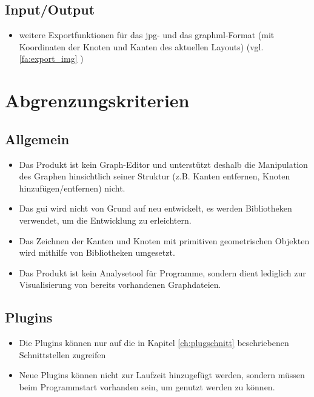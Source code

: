 \subsection{Input/Output}
  \begin{itemize}
    \item weitere Exportfunktionen für das \gls{jpg}- und das \gls{graphml}-Format (mit Koordinaten der Knoten und Kanten des aktuellen Layouts) (vgl. \ref{fa:export_img} )
  \end{itemize}
  
\section{Abgrenzungskriterien}

\subsection{Allgemein}
  \begin{itemize}
    \item Das Produkt ist kein Graph-Editor und unterstützt deshalb die Manipulation des Graphen hinsichtlich seiner Struktur (z.B. Kanten entfernen, Knoten hinzufügen/entfernen) nicht.
    \item Das \gls{gui} wird nicht von Grund auf neu entwickelt, es werden Bibliotheken verwendet, um die Entwicklung zu erleichtern.
    \item Das Zeichnen der Kanten und Knoten mit primitiven geometrischen Objekten wird mithilfe von Bibliotheken umgesetzt. %
    \item Das Produkt ist kein Analysetool für Programme, sondern dient lediglich zur Visualisierung von bereits vorhandenen Graphdateien.
  \end{itemize}
\subsection{Plugins}
  \begin{itemize}
    \item Die Plugins können nur auf die in Kapitel \ref{ch:plugschnitt} beschriebenen Schnittstellen zugreifen
    \item Neue Plugins können nicht zur Laufzeit hinzugefügt werden, sondern müssen beim Programmstart vorhanden sein, um genutzt werden zu können.
  \end{itemize}
